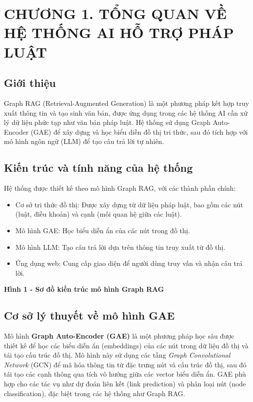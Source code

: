 \documentclass[a4paper,12pt]{article}
\begin{document}
\section{CHƯƠNG 1. TỔNG QUAN VỀ HỆ THỐNG AI HỖ TRỢ PHÁP LUẬT}
\subsection{Giới thiệu}
Graph RAG (Retrieval-Augmented Generation) là một phương pháp kết hợp truy xuất thông tin và tạo sinh văn bản, được ứng dụng trong các hệ thống AI cần xử lý dữ liệu phức tạp như văn bản pháp luật. Hệ thống sử dụng Graph Auto-Encoder (GAE) để xây dựng và học biểu diễn đồ thị tri thức, sau đó tích hợp với mô hình ngôn ngữ (LLM) để tạo câu trả lời tự nhiên.

\subsection{Kiến trúc và tính năng của hệ thống}
Hệ thống được thiết kế theo mô hình Graph RAG, với các thành phần chính:
\begin{itemize}
    \item Cơ sở tri thức đồ thị: Được xây dựng từ dữ liệu pháp luật, bao gồm các nút (luật, điều khoản) và cạnh (mối quan hệ giữa các luật).
    \item Mô hình GAE: Học biểu diễn ẩn của các nút trong đồ thị.
    \item Mô hình LLM: Tạo câu trả lời dựa trên thông tin truy xuất từ đồ thị.
    \item Ứng dụng web: Cung cấp giao diện để người dùng truy vấn và nhận câu trả lời.
\end{itemize}

\textbf{Hình 1 - Sơ đồ kiến trúc mô hình Graph RAG}

\subsection{Cơ sở lý thuyết về mô hình GAE}
Mô hình \textbf{Graph Auto-Encoder (GAE)} là một phương pháp học sâu được thiết kế để học các biểu diễn ẩn (embeddings) của các nút trong dữ liệu đồ thị và tái tạo cấu trúc đồ thị. Mô hình này sử dụng các tầng \textit{Graph Convolutional Network} (GCN) để mã hóa thông tin từ đặc trưng nút và cấu trúc đồ thị, sau đó tái tạo các cạnh thông qua tích vô hướng giữa các vector biểu diễn ẩn. GAE phù hợp cho các tác vụ như dự đoán liên kết (link prediction) và phân loại nút (node classification), đặc biệt trong các hệ thống như Graph RAG.
\end{document}
